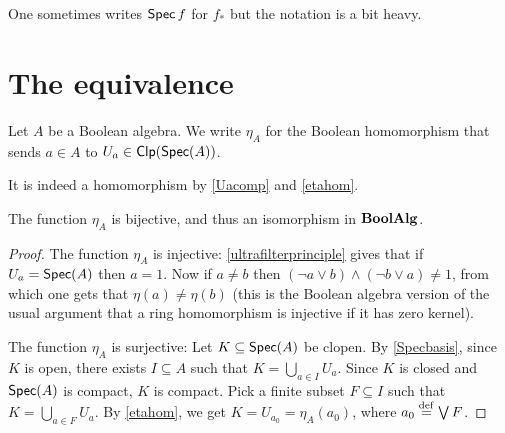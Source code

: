 One sometimes writes $\operatorname*{\mathsf{Spec}} f$ for $f_*$ but
the notation is a bit heavy.

\chapter{The equivalence}
\begin{definition}
Let $A$ be a Boolean algebra. We write $\eta_A$ for the Boolean homomorphism
that sends $a \in A$ to $U_a \in \operatorname*{\mathsf{Clp}}(\operatorname*{\mathsf{Spec}}(A))$.
\end{definition}
It is indeed a homomorphism by \cref{Uacomp} and \cref{etahom}.
\begin{proposition}
The function $\eta_A$ is bijective, and thus an isomorphism in $\mathbf{BoolAlg}$.
\end{proposition}
\begin{proof}
    The function $\eta_A$ is injective: 
    \cref{ultrafilterprinciple} gives that if $U_a = \operatorname*{\mathsf{Spec}}(A)$ then 
    $a = 1$. Now if $a \neq b$ then $(\neg a \vee b) \wedge (\neg b \vee a)
    \neq 1$, from which one gets that $\eta(a) \neq \eta(b)$ (this is the
    Boolean algebra version of the usual argument that a ring homomorphism is
    injective if it has zero kernel). 

    The function $\eta_A$ is surjective: Let $K \subseteq \operatorname*{\mathsf{Spec}}(A)$ be clopen.
    By \cref{Specbasis}, since $K$ is open, there exists $I \subseteq A$ such
    that $K = \bigcup_{a \in I} U_a$. Since $K$ is closed and $\operatorname*{\mathsf{Spec}}(A)$ is
    compact, $K$ is compact. Pick a finite subset $F \subseteq I$ such that $K
    = \bigcup_{a \in F} U_a$. By \cref{etahom}, we get $K = U_{a_0} =
    \eta_A(a_0)$, where $a_0 \stackrel{\mathrm{def}}{=} \bigvee F$.
\end{proof}

